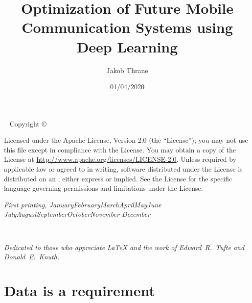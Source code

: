 \documentclass[nobib, b5paper]{tufte-book}
\title{Optimization of Future Mobile Communication Systems using Deep Learning}
\date{01/04/2020}
\author[Jakob Thrane]{Jakob Thrane}
\newcommand{\monthyear}{%
  \ifcase\month\or January\or February\or March\or April\or May\or June\or
  July\or August\or September\or October\or November\or
  December\fi\space\number\year
}
\newcommand{\blankpage}{\newpage\hbox{}\thispagestyle{empty}\newpage}
\begin{document}
\frontmatter





\newpage
\begin{fullwidth}
~\vfill
\thispagestyle{empty}
\setlength{\parindent}{0pt}
\setlength{\parskip}{\baselineskip}
Copyright \copyright\ \the\year\ \thanklessauthor

\par{}

\par{}

\par Licensed under the Apache License, Version 2.0 (the ``License''); you may not
use this file except in compliance with the License. You may obtain a copy
of the License at \url{http://www.apache.org/licenses/LICENSE-2.0}. Unless
required by applicable law or agreed to in writing, software distributed
under the License is distributed on an , either express or implied. See the
License for the specific language governing permissions and limitations
under the License.

\par\textit{First printing, \monthyear}
\end{fullwidth}



\printglossary[type=\acronymtype, nonumberlist, title=Acronyms]

\tableofcontents



\cleardoublepage
~\vfill
\begin{doublespace}
\noindent\fontsize{18}{22}\selectfont\itshape
\nohyphenation
Dedicated to those who appreciate \LaTeX{} 
and the work of \mbox{Edward R.~Tufte} 
and \mbox{Donald E.~Knuth}.
\end{doublespace}
\vfill
\vfill


\cleardoublepage



\mainmatter

\epigraphhead[350]{}
\part{Data is a requirement}


\end{document}
